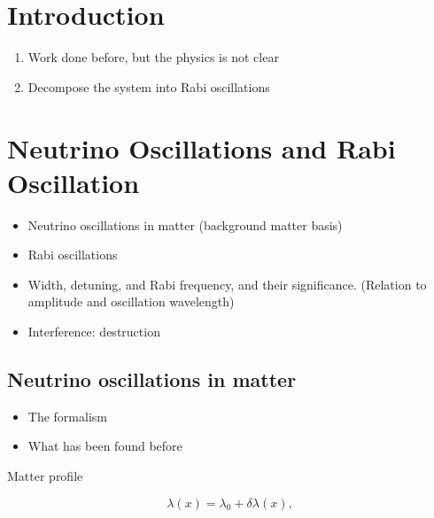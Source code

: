 \documentclass[%
preprint,
 amsmath,amssymb,
 aps,
]{revtex4-1}
\begin{document}
\maketitle


\section{\label{introduction}Introduction}

\begin{enumerate}
    \item Work done before, but the physics is not clear
    \item Decompose the system into Rabi oscillations
\end{enumerate}


\section{\label{rabi}Neutrino Oscillations and Rabi Oscillation}



\begin{itemize}
    \item Neutrino oscillations in matter (background matter basis)
    \item Rabi oscillations
    \item Width, detuning, and Rabi frequency, and their significance. (Relation to amplitude and oscillation wavelength)
    \item Interference: destruction
\end{itemize}


\subsection{Neutrino oscillations in matter}


\begin{itemize}
    \item The formalism
    \item What has been found before
\end{itemize}


Matter profile

\begin{equation}
    \lambda(x) = \lambda_0 + \delta \lambda (x),
\end{equation}
\end{document}
